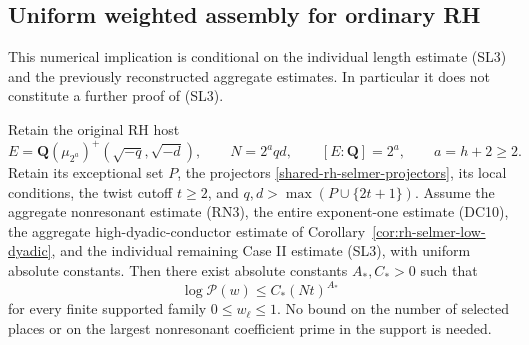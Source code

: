 \subsection{Uniform weighted assembly for ordinary RH}
\label{rh-weighted-selmer-assembly}

This numerical implication is conditional on the individual length
estimate (SL3) and the previously reconstructed aggregate estimates.
In particular it does not constitute a further proof of (SL3).

\begin{proposition}
\label{rh-weighted-selmer-assembly-prop}
Retain the original RH host
\[
 E=\mathbf Q(\mu_{2^a})^+(\sqrt{-q},\sqrt{-d}),\qquad
 N=2^a qd,\qquad [E:\mathbf Q]=2^a,\qquad a=h+2\ge2.
\]
Retain its exceptional set \(P\), the projectors
\eqref{shared-rh-selmer-projectors}, its local conditions, the
twist cutoff \(t\ge2\), and \(q,d>\max(P\cup\{2t+1\})\).
Assume the aggregate nonresonant estimate (RN3), the entire
exponent-one estimate (DC10), the aggregate high-dyadic-conductor
estimate of Corollary~\ref{cor:rh-selmer-low-dyadic}, and the individual
remaining Case II estimate (SL3), with uniform absolute constants.
Then there exist absolute constants \(A_*,C_*>0\) such that
\[
 \log\mathcal P(w)\le C_*(Nt)^{A_*}
\]
for every finite supported family \(0\le w_\ell\le1\).
No bound on the number of selected places or on the largest
nonresonant coefficient prime in the support is needed.
\end{proposition}

